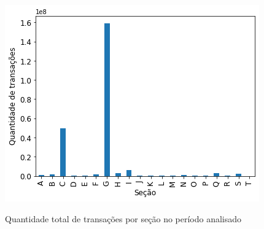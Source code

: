 \begin{figure}[htb]
	\centering
    \caption{Quantidade total de transações por seção no período analisado}
    \includegraphics[scale=0.7]{images/base-de-dados-15.2-transacoes-total-por-secao.png}
    \label{fig:pandemia:descritiva-15.2-transacoes-total-por-secao}
    \fautor
\end{figure}

